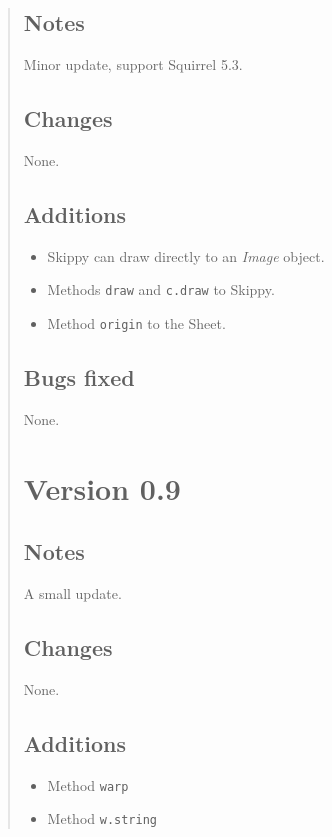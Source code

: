 \documentclass[twoside,10pt,openany]{report}
\newcommand{\squirrel}{{\sc Squirrel} }
\newcounter{sc}[chapter]
\begin{document}
\begin{quote}
\subsection{Notes}

Minor update, support \squirrel 5.3.

\subsection{Changes}

None.

\subsection{Additions}

\begin{itemize}
\item Skippy can draw directly to an {\it Image} object.
\item Methods {\tt draw} and {\tt c.draw} to Skippy.
\item Method {\tt origin} to the Sheet.
\end{itemize}

\subsection{Bugs fixed}

None.

\section{Version 0.9}

\subsection{Notes}

A small update.

\subsection{Changes}

None.

\subsection{Additions}

\begin{itemize}
\item Method {\tt warp}
\item Method {\tt w.string}
\end{itemize}


\end{quote}
\end{document}
